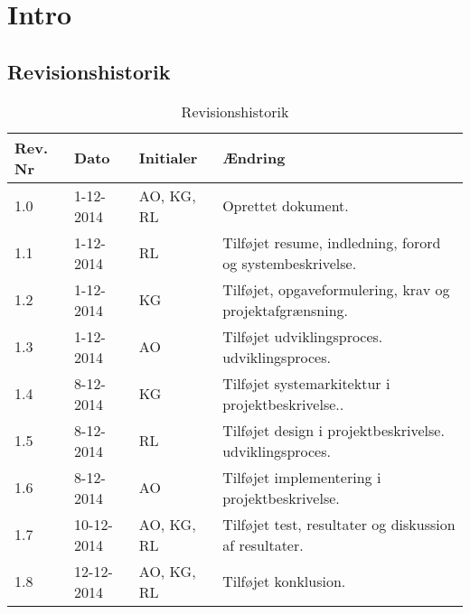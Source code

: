 \chapter{Intro}

\section{Revisionshistorik}
\begin{table}[H]
	\centering
		\begin{tabular}{|p{1.7 cm}|p{2 cm}|p{2.5 cm}|p{6.8 cm}|} 
		\hline
			\textbf{Rev. Nr} & \textbf{Dato}		& \textbf{Initialer} 	& \textbf{Ændring} \\ \hline
			1.0 	& 1-12-2014 & AO, KG, RL  & Oprettet dokument.  \\ \hline
			1.1 	& 1-12-2014 & RL  & Tilføjet resume, indledning, forord \newline og systembeskrivelse. \\ \hline
			1.2 	& 1-12-2014 & KG  & Tilføjet, opgaveformulering, krav \newline og projektafgrænsning. 	\\ \hline
			1.3 	& 1-12-2014 & AO  & Tilføjet udviklingsproces. \newline udviklingsproces.	\\ \hline
			1.4 	& 8-12-2014 & KG  & Tilføjet systemarkitektur \newline i projektbeskrivelse..	\\ \hline
			1.5 	& 8-12-2014 & RL  & Tilføjet design i projektbeskrivelse. \newline udviklingsproces.	\\ \hline
			1.6 	& 8-12-2014 & AO  & Tilføjet implementering \newline i projektbeskrivelse.	\\ \hline
			1.7 	& 10-12-2014 & AO, KG, RL  & Tilføjet test, resultater og \newline diskussion af resultater.	\\ \hline
			1.8 	& 12-12-2014 & AO, KG, RL  & Tilføjet konklusion.	\\ \hline

		\end{tabular}
	\caption{Revisionshistorik}
\end{table}


\vspace{0.5cm}


